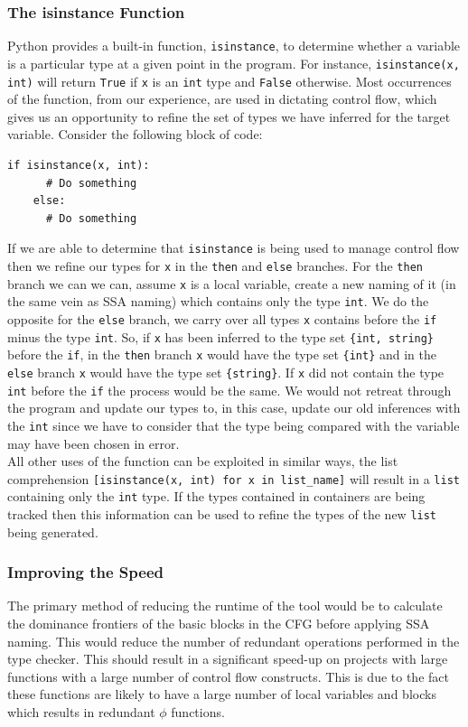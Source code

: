 \documentclass[12pt, titlepage]{article}
\begin{document}
\subsubsection*{The isinstance Function}
Python provides a built-in function, \texttt{isinstance}, to determine whether a variable is a particular type at a given point in the program. For instance, \texttt{isinstance(x, int)} will return \texttt{True} if \texttt{x} is an \texttt{int} type and \texttt{False} otherwise. Most occurrences of the function, from our experience, are used in dictating control flow, which gives us an opportunity to refine the set of types we have inferred for the target variable. Consider the following block of code:
\begin{lstlisting}[mathescape]
    if isinstance(x, int):
      # Do something
    else:
      # Do something
\end{lstlisting}
If we are able to determine that \texttt{isinstance} is being used to manage control flow then we refine our types for \texttt{x} in the \texttt{then} and \texttt{else} branches. For the \texttt{then} branch we can we can, assume \texttt{x} is a local variable, create a new naming of it (in the same vein as SSA naming) which contains only the type \texttt{int}. We do the opposite for the \texttt{else} branch, we carry over all types \texttt{x} contains before the \texttt{if} minus the type \texttt{int}. So, if \texttt{x} has been inferred to the type set \texttt{\{int, string\}} before the \texttt{if}, in the \texttt{then} branch \texttt{x} would have the type set \texttt{\{int\}} and in the \texttt{else} branch \texttt{x} would have the type set \texttt{\{string\}}. If \texttt{x} did not contain the type \texttt{int} before the \texttt{if} the process would be the same. We would not retreat through the program and update our types to, in this case, update our old inferences with the \texttt{int} since we have to consider that the type being compared with the variable may have been chosen in error. \\
\indent All other uses of the function can be exploited in similar ways, the list comprehension \texttt{[isinstance(x, int) for x in list\_name]} will result in a \texttt{list} containing only the \texttt{int} type. If the types contained in containers are being tracked then this information can be used to refine the types of the new \texttt{list} being generated.

\subsubsection*{Improving the Speed}
The primary method of reducing the runtime of the tool would be to calculate the dominance frontiers of the basic blocks in the CFG before applying SSA naming. This would reduce the number of redundant operations performed in the type checker. This should result in a significant speed-up on projects with large functions with a large number of control flow constructs. This is due to the fact these functions are likely to have a large number of local variables and blocks which results in redundant $\phi$ functions.
\end{document}
